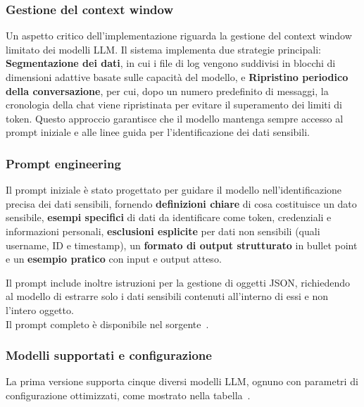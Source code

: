 \documentclass[12pt,twoside]{report}
\begin{document}
\subsubsection{Gestione del context window}
\label{subsubsec:ver1_context_window}

Un aspetto critico dell'implementazione riguarda la gestione del context window limitato dei modelli LLM. Il sistema implementa due strategie principali: \textbf{Segmentazione dei dati}, in cui i file di log vengono suddivisi in blocchi di dimensioni adattive basate sulle capacità del modello, e \textbf{Ripristino periodico della conversazione}, per cui, dopo un numero predefinito di messaggi, la cronologia della chat viene ripristinata per evitare il superamento dei limiti di token. Questo approccio garantisce che il modello mantenga sempre accesso al prompt iniziale e alle linee guida per l'identificazione dei dati sensibili.

\subsubsection{Prompt engineering}
\label{subsubsec:ver1_prompt_engineering}

Il prompt iniziale è stato progettato per guidare il modello nell'identificazione precisa dei dati sensibili, fornendo \textbf{definizioni chiare} di cosa costituisce un dato sensibile, \textbf{esempi specifici} di dati da identificare come token, credenziali e informazioni personali, \textbf{esclusioni esplicite} per dati non sensibili (quali username, ID e timestamp), un \textbf{formato di output strutturato} in bullet point e un \textbf{esempio pratico} con input e output atteso.

Il prompt include inoltre istruzioni per la gestione di oggetti JSON, richiedendo al modello di estrarre solo i dati sensibili contenuti all'interno di essi e non l'intero oggetto.\\
Il prompt completo è disponibile nel sorgente~.

\subsubsection{Modelli supportati e configurazione}
\label{subsubsec:ver1_modelli_supportati}

La prima versione supporta cinque diversi modelli LLM, ognuno con parametri di configurazione ottimizzati, come mostrato nella tabella~.
\end{document}
